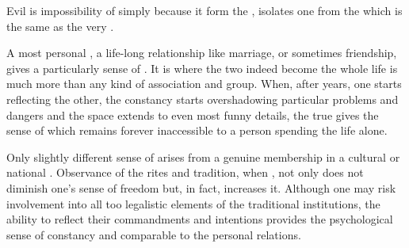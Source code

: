 {{  

}
%
Evil is impossibility of  simply because it 
form the , isolates one from the  which is the same as
the very . 

\mine A most personal , a life-long relationship like marriage, or
sometimes friendship, gives a particularly  sense of
. It is  where the two indeed become   the whole life is much more than any kind of
association and group. When, after years, one starts reflecting the other, the
constancy starts overshadowing particular problems and dangers and the  space
extends to even most funny details, the true  gives the
sense of  which remains forever inaccessible to a
person spending the life alone.

Only slightly different sense of  arises from a genuine
membership in a cultural or national . Observance of the rites and
tradition, when , not only does not diminish one's sense
of freedom but, in fact, increases it. Although one may risk involvement into
all too legalistic elements of the traditional institutions, the ability to
reflect their commandments and intentions provides the psychological sense of
constancy and  comparable to the personal relations.

}
